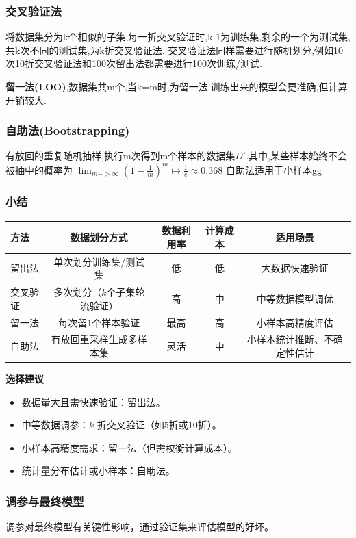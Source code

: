 \subsubsection{交叉验证法}
将数据集分为k个相似的子集,每一折交叉验证时,k-1为训练集,剩余的一个为测试集,共k次不同的测试集,为k折交叉验证法.
交叉验证法同样需要进行随机划分,例如10次10折交叉验证法和100次留出法都需要进行100次训练/测试.
\par \textbf{\heiti 留一法(LOO)},数据集共m个,当k=m时,为留一法.训练出来的模型会更准确,但计算开销较大.
\subsubsection{自助法(Bootstrapping)}
有放回的重复随机抽样,执行m次得到m个样本的数据集$D'$.其中,某些样本始终不会被抽中的概率为
$\lim_{m->\infty}(1-\frac{1}{m})^m\mapsto\frac{1}{e}\approx 0.368$
自助法适用于小样本gg
\subsubsection{小结}
\begin{table}[ht]
\centering
\begin{tabular}{lcccc}
\toprule
\textbf{方法} & \textbf{数据划分方式} & \textbf{数据利用率} & \textbf{计算成本} & \textbf{适用场景} \\
\midrule
留出法 & 单次划分训练集/测试集 & 低 & 低 & 大数据快速验证 \\
交叉验证 & 多次划分（\(k\)个子集轮流验证） & 高 & 中 & 中等数据模型调优 \\
留一法 & 每次留1个样本验证 & 最高 & 高 & 小样本高精度评估 \\
自助法 & 有放回重采样生成多样本集 & 灵活 & 中 & 小样本统计推断、不确定性估计 \\
\bottomrule
\end{tabular}
\end{table}

\textbf{\heiti 选择建议}
\begin{itemize}[noitemsep]
    \item 数据量大且需快速验证：留出法。
    \item 中等数据调参：\(k\)-折交叉验证（如5折或10折）。
    \item 小样本高精度需求：留一法（但需权衡计算成本）。
    \item 统计量分布估计或小样本：自助法。
\end{itemize}
\subsubsection{调参与最终模型}
调参对最终模型有关键性影响，通过验证集来评估模型的好坏。
\newpage
